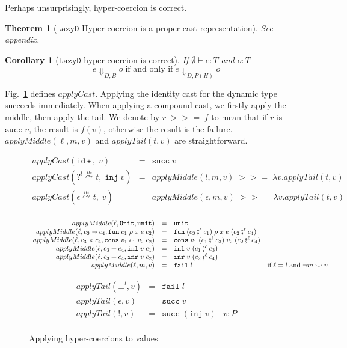 \documentclass[acmsmall,review,anonymous]{acmart}\settopmatter{printfolios=true,printccs=false,printacmref=false}
\newtheorem{theorem}{Theorem}[]
\newtheorem{corollary}{Corollary}[]
\newcommand{\figref}[1]{Fig.~\ref{#1}}
\newcommand{\funrule}[3]{#1 &=& #2 & #3\\}
\newcommand{\plus}[0]{+}
\newcommand{\judgetype}[3]{#1 \vdash #2 : #3}
\newcommand{\lazyD}{$\mathtt{Lazy D}$}
\newcommand{\hyperCoercionI}[0]{\mathtt{id\star}}
\newcommand{\hyperCoercionC}[3]{#1 \overset{#2}{\curvearrowright} #3}
\newcommand{\POOunit}[0]{\mathtt{Unit}}
\newcommand{\POOfun}[2]{#1 \shortrightarrow #2}
\newcommand{\POOprod}[2]{#1 \times #2}
\newcommand{\POOsum}[2]{#1 \plus #2}
\newcommand{\rOOsucc}[1]{\mathtt{succ}\;#1}
\newcommand{\rOOfail}[1]{\mathtt{fail}\;#1}
\newcommand{\hcvOOinj}[2]{\mathtt{inj} \; #2}
\newcommand{\hcvOOfun}[5]{\mathtt{fun} \; #1 \; #2 \; #3 \; #4 \; #5}
\newcommand{\hcvOOtt}[0]{\mathtt{unit}}
\newcommand{\hcvOOcons}[4]{\mathtt{cons}\;#1\;#2\;#3\;#4}
\newcommand{\hcvOOinl}[2]{\mathtt{inl}\;#1\;#2}
\newcommand{\hcvOOinr}[2]{\mathtt{inr}\;#1\;#2}
\newcommand{\sidecond}[1]{\text{if}\;#1}
\begin{document}
Perhaps unsurprisingly, hyper-coercion is correct.

\begin{theorem}[\lazyD{} Hyper-coercion is a proper cast representation]
	See appendix.
\end{theorem}

\begin{corollary}[\lazyD{} hyper-coercion is correct]
	If $ \judgetype{\emptyset}{e}{T} $ and $ o : T $ 
	\[
	e \Downarrow_{D,B} o \; \text{if and only if} \; 
	e \Downarrow_{D,P(H)} o
	\]
\end{corollary}

\figref{hc-applyCast} defines $ applyCast $. Applying the identity cast for the 
dynamic type succeeds immediately. When applying a compound cast, we firstly 
apply the middle, then apply the tail. We denote by $ r \; >>= \; f $ to mean 
that if $ r $ is $ \rOOsucc{v} $, the result is $ f(v) $, otherwise the result 
is the failure.
$ applyMiddle(\ell,m,v) $ and $ applyTail(t,v) $ are straightforward.

\begin{figure}
	\[
	\begin{array}{rclr}
	\funrule{applyCast(\hyperCoercionI,\;v)}{\rOOsucc{v}}{}
	\funrule{applyCast(\hyperCoercionC{?^l}{m}{t},\;\hcvOOinj{P}{v})}{
		applyMiddle(l,m,v) \; >>= \; \lambda v. applyTail(t,v)
	}{}
	\funrule{applyCast(\hyperCoercionC{\epsilon}{m}{t},\;v)}{
		applyMiddle(\epsilon,m,v) \; >>= \; \lambda v. applyTail(t,v)
	}{}
	\end{array}
	\]
	
	\[
	\begin{array}{rclr}
	\funrule{applyMiddle(\ell,\POOunit,\hcvOOtt)}{\hcvOOtt}{}
	\funrule{applyMiddle(\ell,\POOfun{c_3}{c_4},\hcvOOfun{c_1}{\rho}{x}{e}{c_2})}{
		\hcvOOfun{(c_3 \fatsemi^\ell c_1)}{\rho}{x}{e}{(c_2 \fatsemi^\ell c_4)}
	}{}
	\funrule{applyMiddle(\ell,\POOprod{c_3}{c_4},\hcvOOcons{v_1}{c_1}{v_2}{c_2})}{
		\hcvOOcons{v_1}{(c_1 \fatsemi^\ell c_3)}{v_2}{(c_2 \fatsemi^\ell c_4)}
	}{}
	\funrule{applyMiddle(\ell,\POOsum{c_3}{c_4},\hcvOOinl{v}{c_1})}{
		\hcvOOinl{v}{(c_1 \fatsemi^\ell c_3)}
	}{}
	\funrule{applyMiddle(\ell,\POOsum{c_3}{c_4},\hcvOOinr{v}{c_2})}{
		\hcvOOinr{v}{(c_2 \fatsemi^\ell c_4)}
	}{}
	\funrule{applyMiddle(\ell,m,v)}{
		\rOOfail{l}
	}{
		\sidecond{\ell = l \; \text{and} \; \neg m \smile v}
	}
	\end{array}
	\]
	
	\[
	\begin{array}{rclr}
	\funrule{applyTail(\bot^l,v)}{\rOOfail{l}}{}
	\funrule{applyTail(\epsilon,v)}{\rOOsucc{v}}{}
	\funrule{applyTail(!,v)}{\rOOsucc{(\hcvOOinj{P}{v})}}{v : P}
	\end{array}
	\]
	\caption{Applying hyper-coercions to values}
	\label{hc-applyCast}
\end{figure}
\end{document}
